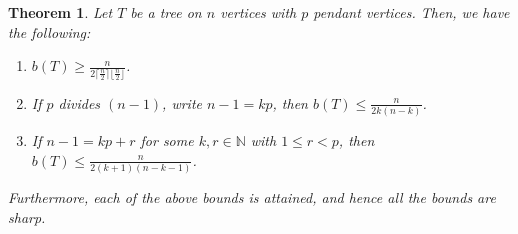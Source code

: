 \documentclass[12pt]{article}
\newtheorem{theorem}{Theorem}[section]
\begin{document}
\begin{theorem}\label{pendant-vertex-extremizer}
   Let $T$ be a tree on $n$ vertices with $p$ pendant vertices. Then, we have the following:  
    \begin{enumerate}
  \item $b(T) \geq \frac{n}{2\lceil \frac{n}{2}\rceil \lfloor \frac{n}{2}\rfloor}$.
      \item If $p$ divides $(n-1)$,  write $n-1=kp$, then $b(T) \leq \frac{n}{2k(n-k)}$.
       \item If $n-1=kp+r$ for some $k,r \in \mathbb{N}$ with $1 \leq r < p$, then $b(T) \leq \frac{n}{2(k+1)(n-k-1)}$.
   
   \end{enumerate}Furthermore, each of the above bounds is attained, and hence all the bounds are sharp.
\end{theorem}
\end{document}
